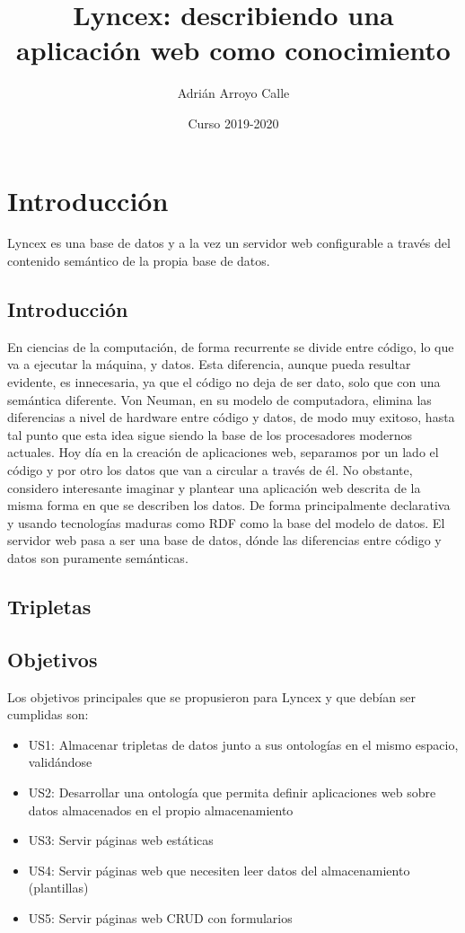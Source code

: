 \documentclass[12pt]{report} %
\title{Lyncex: describiendo una aplicación web como conocimiento}
\author{Adrián Arroyo Calle}
\date{Curso 2019-2020}
\begin{document}
\maketitle

\chapter{Introducción}

Lyncex es una base de datos y a la vez un servidor web configurable a través del contenido semántico de la propia base de datos.

\section{Introducción}
En ciencias de la computación, de forma recurrente se divide entre código, lo que va a ejecutar la máquina, y datos.
Esta diferencia, aunque pueda resultar evidente, es innecesaria, ya que el código no deja de ser dato, solo que con una semántica diferente.
Von Neuman, en su modelo de computadora, elimina las diferencias a nivel de hardware entre código y datos, de modo muy exitoso, hasta tal punto que esta idea sigue siendo la base de los procesadores modernos actuales.
Hoy día en la creación de aplicaciones web, separamos por un lado el código y por otro los datos que van a circular a través de él. 
No obstante, considero interesante imaginar y plantear una aplicación web descrita de la misma forma en que se describen los datos.
De forma principalmente declarativa y usando tecnologías maduras como RDF como la base del modelo de datos.
El servidor web pasa a ser una base de datos, dónde las diferencias entre código y datos son puramente semánticas.

\section{Tripletas}

\section{Objetivos}

Los objetivos principales que se propusieron para Lyncex y que debían ser cumplidas son:

\begin{itemize}
    \item US1: Almacenar tripletas de datos junto a sus ontologías en el mismo espacio, validándose
    \item US2: Desarrollar una ontología que permita definir aplicaciones web sobre datos almacenados en el propio almacenamiento
    \item US3: Servir páginas web estáticas
    \item US4: Servir páginas web que necesiten leer datos del almacenamiento (plantillas)
    \item US5: Servir páginas web CRUD con formularios
\end{itemize}
\end{document}
